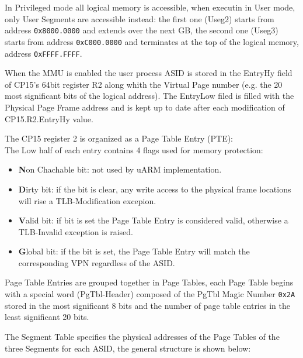 In Privileged mode all logical memory is accessible, when executin in User mode, only User Segments are accessible instead: the first one (Useg2) starts from address \texttt{0x8000.0000} and extends over the next GB, the second one (Useg3) starts from address \texttt{0xC000.0000} and terminates at the top of the logical memory, address \texttt{0xFFFF.FFFF}.

\vspace{10px}



\vspace{10px}

When the MMU is enabled the user process ASID is stored in the EntryHy field of CP15's 64bit register R2 along whith the Virtual Page number (e.g. the 20 most significant bits of the logical address). The EntryLow filed is filled with the Physical Page Frame address and is kept up to date after each modification of CP15.R2.EntryHy value.

The CP15 register 2 is organized as a Page Table Entry (PTE):
\\



The Low half of each entry contains 4 flags used for memory protection:
\begin{itemize}
\item \textbf{N}on Chachable bit: not used by uARM implementation.
\item \textbf{D}irty bit: if the bit is clear, any write access to the physical frame locations will rise a TLB-Modification excepion.
\item \textbf{V}alid bit: if bit is set the Page Table Entry is considered valid, otherwise a TLB-Invalid exception is raised.
\item \textbf{G}lobal bit: if the bit is set, the Page Table Entry will match the corresponding VPN regardless of the ASID.
\end{itemize}

Page Table Entries are grouped together in Page Tables, each Page Table begins with a special word (PgTbl-Header) composed of the PgTbl Magic Number \texttt{0x2A} stored in the most significant 8 bits and the number of page table entries in the least significant 20 bits.

The Segment Table specifies the physical addresses of the Page Tables of the three Segments for each ASID, the general structure is shown below:
\\

